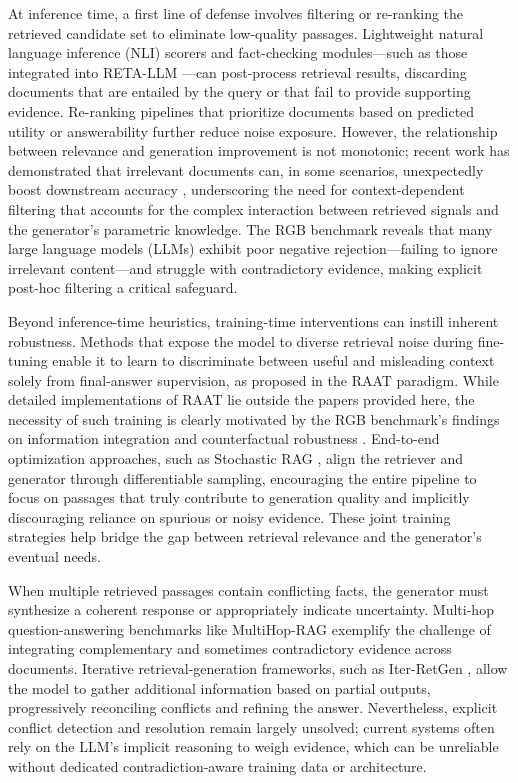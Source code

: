 \documentclass[11pt,a4paper]{article}
\begin{document}
At inference time, a first line of defense involves filtering or re-ranking the retrieved candidate set to eliminate low-quality passages. Lightweight natural language inference (NLI) scorers and fact-checking modules---such as those integrated into RETA-LLM \cite{arxiv:2306.05212v1}---can post-process retrieval results, discarding documents that are entailed by the query or that fail to provide supporting evidence. Re-ranking pipelines that prioritize documents based on predicted utility or answerability further reduce noise exposure. However, the relationship between relevance and generation improvement is not monotonic; recent work has demonstrated that irrelevant documents can, in some scenarios, unexpectedly boost downstream accuracy \cite{arxiv:2401.14887v3}, underscoring the need for context-dependent filtering that accounts for the complex interaction between retrieved signals and the generator's parametric knowledge. The RGB benchmark \cite{arxiv:2309.01431v2} reveals that many large language models (LLMs) exhibit poor negative rejection---failing to ignore irrelevant content---and struggle with contradictory evidence, making explicit post-hoc filtering a critical safeguard.

Beyond inference-time heuristics, training-time interventions can instill inherent robustness. Methods that expose the model to diverse retrieval noise during fine-tuning enable it to learn to discriminate between useful and misleading context solely from final-answer supervision, as proposed in the RAAT paradigm. While detailed implementations of RAAT lie outside the papers provided here, the necessity of such training is clearly motivated by the RGB benchmark's findings on information integration and counterfactual robustness \cite{arxiv:2309.01431v2}. End-to-end optimization approaches, such as Stochastic RAG \cite{arxiv:2405.02816v1}, align the retriever and generator through differentiable sampling, encouraging the entire pipeline to focus on passages that truly contribute to generation quality and implicitly discouraging reliance on spurious or noisy evidence. These joint training strategies help bridge the gap between retrieval relevance and the generator's eventual needs.

When multiple retrieved passages contain conflicting facts, the generator must synthesize a coherent response or appropriately indicate uncertainty. Multi-hop question-answering benchmarks like MultiHop-RAG \cite{arxiv:2401.15391v1} exemplify the challenge of integrating complementary and sometimes contradictory evidence across documents. Iterative retrieval-generation frameworks, such as Iter-RetGen \cite{arxiv:2305.15294v2}, allow the model to gather additional information based on partial outputs, progressively reconciling conflicts and refining the answer. Nevertheless, explicit conflict detection and resolution remain largely unsolved; current systems often rely on the LLM's implicit reasoning to weigh evidence, which can be unreliable without dedicated contradiction-aware training data or architecture.
\end{document}
